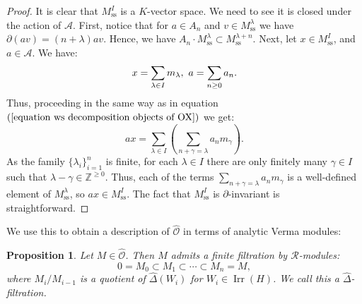 \documentclass{amsart}
\newtheorem{prop}[defi]{ Proposition}
\newcommand{\OX}{\mathcal{O}}
\begin{document}
\begin{proof}
It is clear that $M^I_{\operatorname{ss}}$ is a $K$-vector space. We need to see it is closed under the action of $\mathscr{A}$. First, notice that for $a\in A_n$ and $v\in M^{\lambda}_{\operatorname{ss}}$ we have $\partial (av)=(n+\lambda)av$. Hence, we have $A_n \cdot M^{\lambda}_{\operatorname{ss}}\subset M^{\lambda+n}_{\operatorname{ss}}$. Next, let $x\in M^I_{\operatorname{ss}}$, and $a\in \mathscr{A}$. We have:
\begin{equation*}
    x=\sum_{\lambda\in I}m_{\lambda}, \textnormal{ } a=\sum_{n\geq 0}a_n.
\end{equation*}
Thus, proceeding in the same way as in equation $(\ref{equation ws decomposition objects of OX})$ we get:
\begin{equation*}
    ax=\sum_{\lambda \in I}\left(\sum_{n+ \gamma = \lambda}a_n m_{\gamma}\right).
\end{equation*}
As the family $\{\lambda_i\}_{i=1}^n$ is finite, for each $\lambda \in I$ there are only finitely many $\gamma \in I$ such that $\lambda -\gamma \in \mathbb{Z}^{\geq 0}$. Thus, each of the terms $\sum_{n+ \gamma = \lambda}a_n m_{\gamma}$ is a well-defined element of $M_{\operatorname{ss}}^{\lambda}$, so $ax\in M^I_{\operatorname{ss}}$. The fact that  $M^I_{\operatorname{ss}}$ is $\partial$-invariant is straightforward.
\end{proof}
We use this to obtain a description of $\widehat{\OX}$ in terms of analytic Verma modules:
\begin{prop}\label{prop filtrations by quot of verma}
Let $M\in \widehat{\OX}$. Then $M$ admits a finite filtration by $\mathscr{R}$-modules:
\begin{equation*}
    0=M_0\subset M_1\subset \cdots\subset M_n=M,
\end{equation*}
where $M_{i}/M_{i-1}$ is a quotient of $\widehat{\Delta}(W_i)$ for $W_i\in \operatorname{Irr}(H)$. We call this a $\widehat{\Delta}$-filtration. 
\end{prop}
\end{document}
